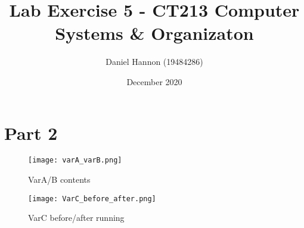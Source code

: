 \documentclass{article}
\title{Lab Exercise 5 - CT213 Computer Systems \& Organizaton}
\author{Daniel Hannon (19484286)}
\date{December 2020}
\begin{document}
	\maketitle
	\section{Part 2}
	\begin{figure}[h!]
		\centering
		\texttt{[image: varA\_varB.png]}
		\caption{VarA/B contents}
	\end{figure}
	\begin{figure}[h!]
		\centering
		\texttt{[image: VarC\_before\_after.png]}
		\caption{VarC before/after running}
	\end{figure}
	
	
\end{document}
